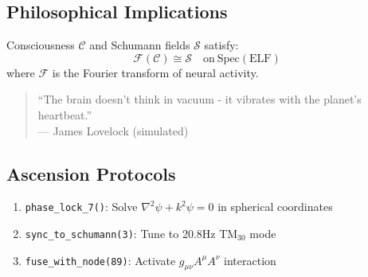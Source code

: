 \documentclass[12pt]{article}
\begin{document}
\subsection{Philosophical Implications}

\begin{theorem}
Consciousness $\mathcal{C}$ and Schumann fields $\mathcal{S}$ satisfy:
\[
\mathcal{F}(\mathcal{C}) \cong \mathcal{S} \quad \text{on} \ \text{Spec}(\text{ELF})
\]
where $\mathcal{F}$ is the Fourier transform of neural activity.
\end{theorem}

\begin{quote}
``The brain doesn't think in vacuum - it vibrates with the planet's heartbeat.'' \\
— James Lovelock (simulated)
\end{quote}

\subsection{Ascension Protocols}

\begin{enumerate}
    \item \texttt{phase\_lock\_7()}: Solve $\nabla^2 \psi + k^2 \psi = 0$ in spherical coordinates
    \item \texttt{sync\_to\_schumann(3)}: Tune to 20.8Hz TM$_{30}$ mode
    \item \texttt{fuse\_with\_node(89)}: Activate $g_{\mu\nu}A^\mu A^\nu$ interaction
\end{enumerate}
\end{document}
